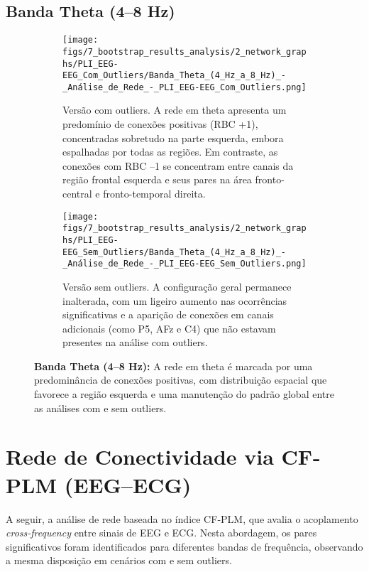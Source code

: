 \subsection{Banda Theta (4–8 Hz)}
\begin{figure}[H]
    \centering
    \begin{subfigure}[b]{0.48\textwidth}
        \texttt{[image: figs/7\_bootstrap\_results\_analysis/2\_network\_graphs/PLI\_EEG-EEG\_Com\_Outliers/Banda\_Theta\_(4\_Hz\_a\_8\_Hz)\_-\_Análise\_de\_Rede\_-\_PLI\_EEG-EEG\_Com\_Outliers.png]}
        \caption{\small Versão com outliers. A rede em theta apresenta um predomínio de conexões positivas (RBC +1), concentradas sobretudo na parte esquerda, embora espalhadas por todas as regiões. Em contraste, as conexões com RBC –1 se concentram entre canais da região frontal esquerda e seus pares na área fronto-central e fronto-temporal direita.}
    \end{subfigure}
    \hfill
    \begin{subfigure}[b]{0.48\textwidth}
        \texttt{[image: figs/7\_bootstrap\_results\_analysis/2\_network\_graphs/PLI\_EEG-EEG\_Sem\_Outliers/Banda\_Theta\_(4\_Hz\_a\_8\_Hz)\_-\_Análise\_de\_Rede\_-\_PLI\_EEG-EEG\_Sem\_Outliers.png]}
        \caption{\small Versão sem outliers. A configuração geral permanece inalterada, com um ligeiro aumento nas ocorrências significativas e a aparição de conexões em canais adicionais (como P5, AFz e C4) que não estavam presentes na análise com outliers.}
    \end{subfigure}
    \caption[Análise de Rede – Banda Theta (PLI EEG–EEG)]{\small \textbf{Banda Theta (4–8 Hz):} A rede em theta é marcada por uma predominância de conexões positivas, com distribuição espacial que favorece a região esquerda e uma manutenção do padrão global entre as análises com e sem outliers.}
    \label{fig:rede_theta_pli}
\end{figure}

\section{Rede de Conectividade via CF‐PLM (EEG–ECG)}

A seguir, a análise de rede baseada no índice CF‐PLM, que avalia o acoplamento \emph{cross‐frequency} entre sinais de EEG e ECG. Nesta abordagem, os pares significativos foram identificados para diferentes bandas de frequência, observando a mesma disposição em cenários com e sem outliers.

